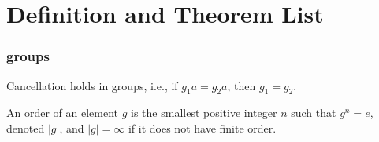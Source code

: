 \chapter{Definition and Theorem List}
\subsection{groups}
\begin{prop}
    Cancellation holds in groups, i.e., if $g_1a=g_2a$, then $g_1=g_2$.
\end{prop}

\begin{defn}[order]
    An order of an element $g$ is the smallest positive integer $n$ such that $g^n=e$, denoted $|g|$, and $|g|=\infty$ if it does not have finite order.
\end{defn}


